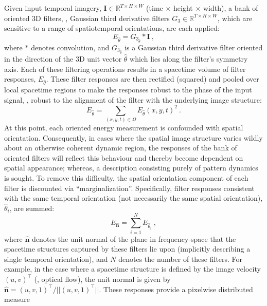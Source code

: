 Given input temporal imagery, $\mathbf{I} \in \mathbb{R}^{T \times H \times W}$ (time $\times$ height $\times$ width), a bank of oriented 3D
filters, \eg, Gaussian third derivative filters $G_3 \in \mathbb{R}^{T \times H \times W}$, which are sensitive to a range of
spatiotemporal orientations, are each applied:
\begin{equation}
	E_{\hat{\theta}} = G_{3_{\hat{\theta}}} \ast \mathbf{I}\ ,
\end{equation}
where $\ast$ denotes convolution, and $G_{3_{\hat{\theta}}}$ is a Gaussian third derivative filter oriented in the direction of the 3D unit vector $\hat{\theta}$ which lies along the filter's symmetry axis. Each of these filtering operations results in a spacetime volume of filter responses, $E_{\hat{\theta}}$.
These filter responses are then rectified (squared) and
pooled over local spacetime regions to make the responses robust
to the phase of the input signal, \ie, robust to the
alignment of the filter with the underlying image
structure:
\begin{equation}
	\bar{E}_{\hat{\theta}} = \sum_{(x, y, t) \in \Omega}{{E_{\hat{\theta}}(x, y, t)}^2}\ .
\end{equation}
At this point, each oriented energy measurement is confounded with spatial orientation. Consequently, in cases where the 
spatial image structure varies wildly about an otherwise coherent dynamic
region, the responses of the bank of oriented filters will reflect this
behaviour and thereby become dependent on spatial appearance; whereas, a description consisting purely 
of pattern dynamics is sought.
To remove this difficulty, the spatial orientation component of each filter is discounted via ``marginalization''. Specifically, filter responses consistent with the same temporal orientation (not necessarily the same spatial orientation), $\hat{\theta}_i$, are summed:
\begin{equation}
	E_{\hat{\mathbf{n}}} = \sum_{i = 1}^{N}{E_{\hat{\theta}_i}}\ ,
	\label{eq:oriented_filter_2.8}
\end{equation}
where $\hat{\mathbf{n}}$ denotes the unit normal of the plane in frequency-space that the spacetime structures captured by these filters lie upon (implicitly describing a single temporal orientation), and $N$ denotes the number of these filters.
For example, in the case where a spacetime structure is defined by the image velocity $(u, v)^\top$ (\ie, optical flow), the unit normal is given by $\hat{\mathbf{n}}=(u, v, 1)^\top / ||(u, v, 1)^\top||$.
These responses provide a pixelwise distributed measure
